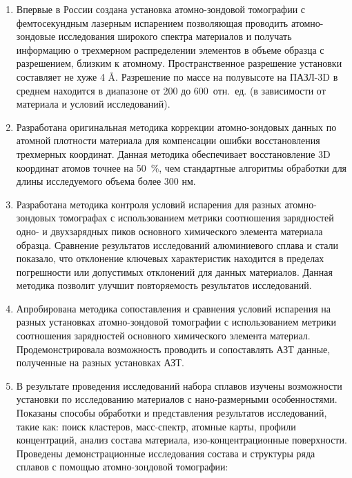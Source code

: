 \begin{enumerate}[beginpenalty=10000]
	\item Впервые в России создана установка атомно-зондовой томографии с фемтосекундным лазерным испарением позволяющая проводить атомно-зондовые исследования широкого спектра материалов  и получать информацию о трехмерном распределении элементов в объеме образца с разрешением, близким к атомному. Пространственное разрешение установки составляет не хуже 4 \r{A}. Разрешение по массе на полувысоте на ПАЗЛ-3D в среднем находится в диапазоне от 200 до 600~отн.~ед. (в зависимости от материала и условий исследований).
	\item Разработана оригинальная методика коррекции атомно-зондовых данных по атомной плотности материала для компенсации ошибки восстановления трехмерных координат. Данная методика обеспечивает восстановление 3D координат атомов точнее на 50~\%, чем стандартные алгоритмы обработки для длины исследуемого объема более 300 нм.   
	\item Разработана методика контроля условий испарения для разных атомно-зондовых томографах с использованием метрики соотношения зарядностей одно- и двухзарядных пиков основного химического элемента материала образца. Сравнение результатов исследований алюминиевого сплава и стали показало, что отклонение ключевых характеристик находится в пределах погрешности или допустимых отклонений для данных материалов. Данная методика позволит улучшит повторяемость результатов исследований.
	\item Апробирована методика сопоставления и сравнения условий испарения на разных установках атомно-зондовой томографии с использованием метрики соотношения зарядностей основного химического элемента материал. Продемонстрировала возможность проводить и сопоставлять АЗТ данные, полученные на разных установках АЗТ.
	\item В результате проведения исследований набора сплавов изучены возможности установки по исследованию материалов с нано-размерными особенностями. Показаны способы обработки и представления результатов исследований, такие как: поиск кластеров, масс-спектр, атомные карты, профили концентраций, анализ состава материала, изо-концентрационные поверхности.  Проведены демонстрационные исследования состава и структуры ряда сплавов с помощью атомно-зондовой томографии:

\end{enumerate}
